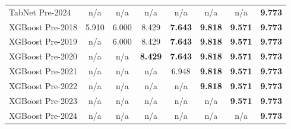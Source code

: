 \begin{table}[htbp]
{\begin{tabular}{lccccccc}
TabNet Pre-2024 & n/a & n/a & n/a & n/a & n/a & n/a & \textbf{9.773} \\
XGBoost Pre-2018 & 5.910 & 6.000 & 8.429 & \textbf{7.643} & \textbf{9.818} & \textbf{9.571} & \textbf{9.773} \\
XGBoost Pre-2019 & n/a & 6.000 & 8.429 & \textbf{7.643} & \textbf{9.818} & \textbf{9.571} & \textbf{9.773} \\
XGBoost Pre-2020 & n/a & n/a & \textbf{8.429} & \textbf{7.643} & \textbf{9.818} & \textbf{9.571} & \textbf{9.773} \\
XGBoost Pre-2021 & n/a & n/a & n/a & 6.948 & \textbf{9.818} & \textbf{9.571} & \textbf{9.773} \\
XGBoost Pre-2022 & n/a & n/a & n/a & n/a & \textbf{9.818} & \textbf{9.571} & \textbf{9.773} \\
XGBoost Pre-2023 & n/a & n/a & n/a & n/a & n/a & \textbf{9.571} & \textbf{9.773} \\
XGBoost Pre-2024 & n/a & n/a & n/a & n/a & n/a & n/a & \textbf{9.773} \\
\bottomrule
\end{tabular}%
}
\end{table}

